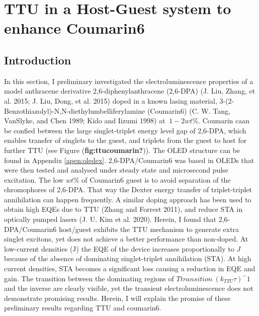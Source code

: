 \documentclass[
  letterpaper,
  DIV=11,
  numbers=noendperiod,
  oneside]{scrreprt}
\begin{document}

\hypertarget{sec-c6}{%
\chapter{TTU in a Host-Guest system to enhance Coumarin6}\label{sec-c6}}

\hypertarget{introduction-1}{%
\section{Introduction}\label{introduction-1}}

In this section, I preliminary investigated the electroluminescence
properties of a model anthracene derivative 2,6-diphenylanthracene
(2,6-DPA) (J. Liu, Zhang, et al. 2015; J. Liu, Dong, et al. 2015) doped
in a known lasing material,
3-(2-Benzothiazolyl)-N,N-diethylumbelliferylamine (Coumarin6) (C. W.
Tang, VanSlyke, and Chen 1989; Kido and Iizumi 1998) at \(~1-2wt\%\).
Coumarin caan be confied between the large singlet-triplet energy level
gap of 2,6-DPA, which enables transfer of singlets to the guest, and
triplets from the guest to host for further TTU (see Figure
(\textbf{fig:ttucoumarin?})). The OLED structure can be found in
Appendix \protect\hyperlink{apen:oledex}{{[}apen:oledex{]}}.
2,6-DPA/Coumarin6 was based in OLEDs that were then tested and analysed
under steady state and microsecond pulse excitation. The low \(wt\%\) of
Coumarin6 guest is to avoid separation of the chromophores of 2,6-DPA.
That way the Dexter energy transfer of triplet-triplet annihilation can
happen frequently. A similar doping approach has been used to obtain
high EQEs due to TTU (Zhang and Forrest 2011), and reduce STA in
optically pumped lasers (J. U. Kim et al. 2020). Herein, I found that
2,6-DPA/Coumarin6 host/guest exhibits the TTU mechanism to generate
extra singlet excitons, yet does not achieve a better performance than
non-doped. At low-current densities (J) the EQE of the device increases
proportionally to \(J\) because of the absence of dominating
singlet-triplet annihilation (STA). At high current densities, STA
becomes a significant loss causing a reduction in EQE and gain. The
transition between the dominating regions of
\(T{transition}\>(k_{TTU}\tau)^-1\) and the inverse are clearly visible,
yet the transient electroluminescence does not demonstrate promising
results. Herein, I will explain the promise of these preliminary results
regarding TTU and coumarin6.
\end{document}
